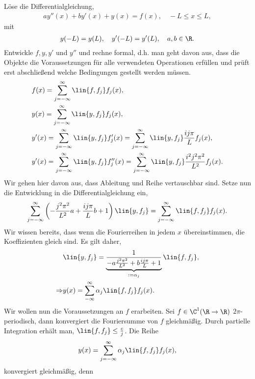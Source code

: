 \begin{bsp}
\label{bsp:1.60}
Löse die Differentialgleichung,
\begin{align*}
ay''(x) + by'(x) + y(x) = f(x),\quad -L\le x\le L,
\end{align*}
mit
\begin{align*}
y(-L) = y(L),\quad y'(-L) = y'(L),\quad a,b\in\R.
\end{align*}
Entwickle $f,y,y'$ und $y''$ und rechne formal, d.h. man geht davon aus, dass
die Objekte die Voraussetzungen für alle verwendeten Operationen erfüllen und prüft erst
abschließend welche Bedingungen gestellt werden müssen.
\begin{align*}
&f(x) = \sum\limits_{j=-\infty}^\infty \lin{f,f_j} f_j(x),\\
&y(x) = \sum\limits_{j=-\infty}^\infty \lin{y,f_j} f_j(x),\\
&y'(x) = \sum\limits_{j=-\infty}^\infty \lin{y,f_j} f_j'(x) =
\sum\limits_{j=-\infty}^\infty \lin{y,f_j} \frac{ij\pi}{L}f_j(x),\\
&y'(x) = \sum\limits_{j=-\infty}^\infty \lin{y,f_j} f_j''(x) =
\sum\limits_{j=-\infty}^\infty \lin{y,f_j} \frac{i^2j^2\pi^2}{L^2}f_j(x).
\end{align*}
Wir gehen hier davon aus, dass Ableitung und Reihe vertauschbar sind. Setze
nun die Entwicklung in die Differentialgleichung ein,
\begin{align*}
\sum\limits_{j=-\infty}^\infty \left(-\frac{j^2\pi^2}{L^2}a +
\frac{ij\pi}{L}b + 1\right)\lin{y,f_j} = \sum\limits_{j=-\infty}^\infty
\lin{f,f_j}f_j(x).
\end{align*}
Wir wissen bereits, dass wenn die Fourierreihen in jedem $x$ übereinstimmen,
die Koeffizienten gleich sind. Es gilt daher,
\begin{align*}
&\lin{y,f_j} = \underbrace{\frac{1}{-a\frac{j^2\pi^2}{L^2} +
b\frac{ij\pi}{L}+1}}_{:=\alpha_j}\lin{f,f_j},\\
\Rightarrow & y(x) = \sum\limits_{-\infty}^\infty \alpha_j \lin{f,f_j}f_j(x).
\end{align*}
Wir wollen nun die Voraussetzungen an $f$ erarbeiten. Sei $f\in\C^1(\R\to\R)$
$2\pi$-periodisch, dann konvergiert die Fouriersumme von $f$ gleichmäßig. Durch
partielle Integration erhält man, $\lin{f,f_j} \le \frac{c}{j}$. Die Reihe
\begin{align*}
y(x) = \sum\limits_{j=-\infty}^\infty \alpha_j \lin{f,f_j} f_j(x),
\end{align*}
konvergiert gleichmäßig, denn 
\begin{align*}

\end{align*}
\end{bsp}
